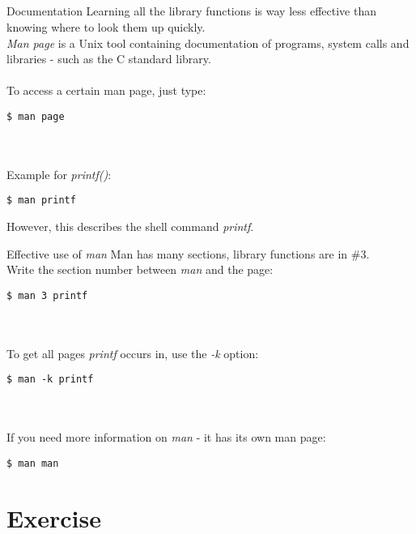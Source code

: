 \subsection{}
\begin{frame}[fragile]{Documentation}
	Learning all the library functions is way less effective than knowing where to look them up quickly. \\
	\textit{Man page} is a Unix tool containing documentation of programs, system calls and libraries - such as the C standard library. \\ \ \\
	To access a certain man page, just type:
	\begin{lstlisting}[numbers=none, basicstyle=\itshape\small]
$ man page
\end{lstlisting} \ \\ \ \\
Example for \textit{printf()}:
	\begin{lstlisting}[numbers=none]
$ man printf
\end{lstlisting}
However, this describes the shell command \textit{printf}.
\end{frame}
\begin{frame}[fragile]{Effective use of \textit{man}}
	Man has many sections, library functions are in \#3. \\
	Write the section number between \textit{man} and the page:
	\begin{lstlisting}[numbers=none]
$ man 3 printf
\end{lstlisting} \ \\ \ \\
	To get all pages \textit{printf} occurs in, use the \textit{-k} option:
	\begin{lstlisting}[numbers=none]
$ man -k printf
\end{lstlisting} \ \\ \ \\
	If you need more information on \textit{man} - it has its own man page:
	\begin{lstlisting}[numbers=none]
$ man man
\end{lstlisting}
\end{frame}
\section{Exercise}

